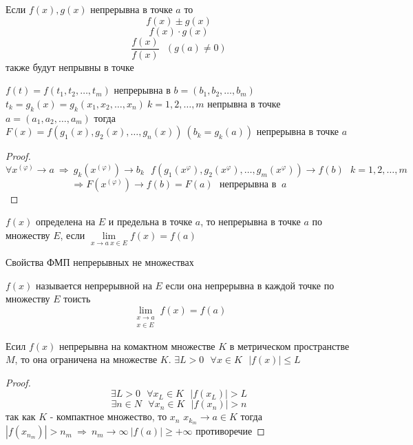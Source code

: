 \begin{theorem}
  Если $f(x), g(x)$ непрерывна в точке $a$ то
  $$
  f(x) \pm g(x)
  $$
  $$
  f(x) \cdot g(x)
  $$
  $$
  \frac{f(x)}{f(x)} ~~~ (g(a) \not= 0)
  $$
  также будут непрывны в точке
\end{theorem}

\begin{theorem}
  $f(t) = f(t_1, t_2, \ldots, t_m)$ непрерывна в $b = (b_1, b_2, \ldots, b_m)$
  $t_k = g_k(x) = g_k(x_1, x_2, \ldots, x_n) ~ k = 1,2, \ldots, m$ непрывна в
  точке $a = (a_1, a_2, \ldots, a_m)$ тогда
  $F(x) = f(g_1(x), g_2(x), \ldots, g_n(x)) ~ (b_k = g_k(a))$ непрерывна в
  точке $a$
\end{theorem}

\begin{proof}
  $$
  \forall x^{(\varphi)} \to a ~ \Rightarrow ~ g_k(x^{(\varphi)}) \to b_k ~~~
  f(g_1(x^{\varphi}), g_2(x^{\varphi}), \ldots, g_m(x^{\varphi})) \to f(b) ~~~
  k = 1,2, \ldots, m
  $$
  $$
  \Rightarrow F(x^{(\varphi)}) \to f(b) = F(a) ~~~ \text{непрерывна в } ~ a
  $$
\end{proof}

\begin{define}
  $f(x)$ определена на $E$ и предельна в точке $a$, то непрерывна в точке $a$
  по множеству $E$, если $\lim \limits_{x \to a ~ x \in E} f(x) = f(a)$
\end{define}

\begin{title}[\Large]
  Свойства ФМП непрерывных не множествах
\end{title}

\begin{define}
  $f(x)$ называется непрерывной на $E$ если она непрерывна в каждой точке по
  множеству $E$ тоисть
  $$
  \lim_{\substack{x \to a \\ x \in E}} f(x) = f(a)
  $$
\end{define}

\begin{theorem}
  Есил $f(x)$ непрерывна на комактном множестве $K$ в метрическом пространстве
  $M$, то она ограничена на множестве $K$. $\exists L > 0 ~~~
  \forall x \in K ~~~ |f(x)| \le L$
\end{theorem}

\begin{proof}
  $$
  \exists L > 0 ~~~ \forall x_L \in K ~~~ |f(x_L)| > L
  $$
  $$
  \exists n \in N ~~~ \forall x_n \in K ~~~ |f(x_n)| > n
  $$
  так как $K$ - компактное множество, то $x_n$ $x_{k_m} \to a \in K$ тогда
  $|f(x_{n_m})| > n_m ~ \Rightarrow ~ n_m \to \infty ~ |f(a)| \ge +\infty$
  противоречие
\end{proof}



